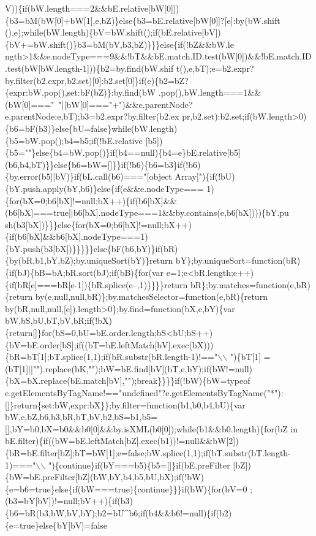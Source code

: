 \begin{DoxyCode}
{      V))\{if(bW.length===2&&bE.relative[bW[0]])\{b3=bM(bW[0]+bW[1],e,bZ)\}else\{b3=bE.relative[bW[0]]?[e]:by(bW.shift
      (),e);while(bW.length)\{bV=bW.shift();if(bE.relative[bV])\{bV+=bW.shift()\}b3=bM(bV,b3,bZ)\}\}\}else\{if(!bZ&&bW.le
      ngth>1&&e.nodeType===9&&!bT&&bE.match.ID.test(bW[0])&&!bE.match.ID.test(bW[bW.length-1]))\{b2=by.find(bW.shif
      t(),e,bT);e=b2.expr?by.filter(b2.expr,b2.set)[0]:b2.set[0]\}if(e)\{b2=bZ?\{expr:bW.pop(),set:bF(bZ)\}:by.find(bW
      .pop(),bW.length===1&&(bW[0]==="~"||bW[0]==="+")&&e.parentNode?e.parentNode:e,bT);b3=b2.expr?by.filter(b2.ex
      pr,b2.set):b2.set;if(bW.length>0)\{b6=bF(b3)\}else\{bU=false\}while(bW.length)\{b5=bW.pop();b4=b5;if(!bE.relative
      [b5])\{b5=""\}else\{b4=bW.pop()\}if(b4==null)\{b4=e\}bE.relative[b5](b6,b4,bT)\}\}else\{b6=bW=[]\}\}if(!b6)\{b6=b3\}if(!b6)\{by.error(b5||bV)\}if(bL.call(b6)==="[object
       Array]")\{if(!bU)\{bY.push.apply(bY,b6)\}else\{if(e&&e.nodeType===
      1)\{for(bX=0;b6[bX]!=null;bX++)\{if(b6[bX]&&(b6[bX]===true||b6[bX].nodeType===1&&by.contains(e,b6[bX])))\{bY.pu
      sh(b3[bX])\}\}\}else\{for(bX=0;b6[bX]!=null;bX++)\{if(b6[bX]&&b6[bX].nodeType===1)\{bY.push(b3[bX])\}\}\}\}\}else\{bF(b6,bY)\}if(bR)\{by(bR,b1,bY,bZ);by.uniqueSort(bY)\}return
       bY\};by.uniqueSort=function(bR)\{if(bJ)\{bB=bA;bR.sort(bJ);if(bB)\{for(var e=1;e<bR.length;e++)\{if(bR[e]===bR[e-1])\{bR.splice(e--,1)\}\}\}\}return
       bR\};by.matches=function(e,bR)\{return by(e,null,null,bR)\};by.matchesSelector=function(e,bR)\{return
       by(bR,null,null,[e]).length>0\};by.find=function(bX,e,bY)\{var
       bW,bS,bU,bT,bV,bR;if(!bX)\{return[]\}for(bS=0,bU=bE.order.length;bS<bU;bS++)\{bV=bE.order[bS];if((bT=bE.leftMatch[bV].exec(bX)))\{bR=bT[1];bT.splice(1,1);if(bR.substr(bR.length-1)!=="\(\backslash\)\(\backslash\)
      ")\{bT[1]
      =(bT[1]||"").replace(bK,"");bW=bE.find[bV](bT,e,bY);if(bW!=null)\{bX=bX.replace(bE.match[bV],"");break\}\}\}\}if(!bW)\{bW=typeof
       e.getElementsByTagName!=="undefined"?e.getElementsByTagName("*"):[]\}return\{set:bW,expr:bX\}\};by.filter=function(b1,b0,b4,bU)\{var
       bW,e,bZ,b6,b3,bR,bT,bV,b2,bS=b1,b5=[],bY=b0,bX=b0&&b0[0]&&by.isXML(b0[0]);while(b1&&b0.length)\{for(bZ in
       bE.filter)\{if((bW=bE.leftMatch[bZ].exec(b1))!=null&&bW[2])\{bR=bE.filter[bZ];bT=bW[1];e=false;bW.splice(1,1);if(bT.substr(bT.length-1)==="\(\backslash\)\(\backslash\)
      ")\{continue\}if(bY===b5)\{b5=[]\}if(bE.preFilter
      [bZ])\{bW=bE.preFilter[bZ](bW,bY,b4,b5,bU,bX);if(!bW)\{e=b6=true\}else\{if(bW===true)\{continue\}\}\}if(bW)\{for(bV=0
      ;(b3=bY[bV])!=null;bV++)\{if(b3)\{b6=bR(b3,bW,bV,bY);b2=bU^b6;if(b4&&b6!=null)\{if(b2)\{e=true\}else\{bY[bV]=false
}
\end{DoxyCode}
